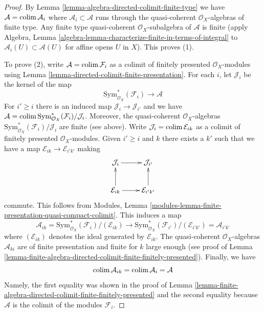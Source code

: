 \begin{proof}
By Lemma \ref{lemma-algebra-directed-colimit-finite-type} we have
$\mathcal{A} = \mathop{\mathrm{colim}}\nolimits \mathcal{A}_i$ where
$\mathcal{A}_i \subset \mathcal{A}$ runs through the
quasi-coherent $\mathcal{O}_X$-algebras of finite type.
Any finite type quasi-coherent $\mathcal{O}_X$-subalgebra
of $\mathcal{A}$ is finite (apply Algebra, Lemma
\ref{algebra-lemma-characterize-finite-in-terms-of-integral}
to $\mathcal{A}_i(U) \subset \mathcal{A}(U)$ for affine opens $U$
in $X$). This proves (1).

\medskip\noindent
To prove (2), write $\mathcal{A} = \mathop{\mathrm{colim}}\nolimits \mathcal{F}_i$
as a colimit of finitely presented $\mathcal{O}_X$-modules using
Lemma \ref{lemma-directed-colimit-finite-presentation}.
For each $i$, let $\mathcal{J}_i$ be the kernel of the map
$$
\text{Sym}^*_{\mathcal{O}_X}(\mathcal{F}_i) \longrightarrow \mathcal{A}
$$
For $i' \geq i$ there is an induced map $\mathcal{J}_i \to \mathcal{J}_{i'}$
and we have $\mathcal{A} =
\mathop{\mathrm{colim}}\nolimits \text{Sym}^*_{\mathcal{O}_X}(\mathcal{F}_i)/\mathcal{J}_i$.
Moreover, the quasi-coherent $\mathcal{O}_X$-algebras
$\text{Sym}^*_{\mathcal{O}_X}(\mathcal{F}_i)/\mathcal{J}_i$
are finite (see above). Write $\mathcal{J}_i = \mathop{\mathrm{colim}}\nolimits \mathcal{E}_{ik}$
as a colimit of finitely presented $\mathcal{O}_X$-modules.
Given $i' \geq i$ and $k$ there exists a $k'$ such that we
have a map $\mathcal{E}_{ik} \to \mathcal{E}_{i'k'}$
making
$$
\xymatrix{
\mathcal{J}_i \ar[r] & \mathcal{J}_{i'} \\
\mathcal{E}_{ik} \ar[u] \ar[r] & \mathcal{E}_{i'k'} \ar[u]
}
$$
commute. This follows from
Modules, Lemma \ref{modules-lemma-finite-presentation-quasi-compact-colimit}.
This induces a map
$$
\mathcal{A}_{ik} =
\text{Sym}^*_{\mathcal{O}_X}(\mathcal{F}_i)/(\mathcal{E}_{ik})
\longrightarrow
\text{Sym}^*_{\mathcal{O}_X}(\mathcal{F}_{i'})/(\mathcal{E}_{i'k'}) =
\mathcal{A}_{i'k'}
$$
where $(\mathcal{E}_{ik})$ denotes the ideal generated by $\mathcal{E}_{ik}$.
The quasi-coherent $\mathcal{O}_X$-algebras $\mathcal{A}_{ki}$
are of finite presentation and finite for $k$ large enough
(see proof of
Lemma \ref{lemma-finite-algebra-directed-colimit-finite-finitely-presented}).
Finally, we have
$$
\mathop{\mathrm{colim}}\nolimits \mathcal{A}_{ik} = \mathop{\mathrm{colim}}\nolimits \mathcal{A}_i = \mathcal{A}
$$
Namely, the first equality was shown in the proof of
Lemma \ref{lemma-finite-algebra-directed-colimit-finite-finitely-presented}
and the second equality because $\mathcal{A}$ is the colimit of
the modules $\mathcal{F}_i$.
\end{proof}





